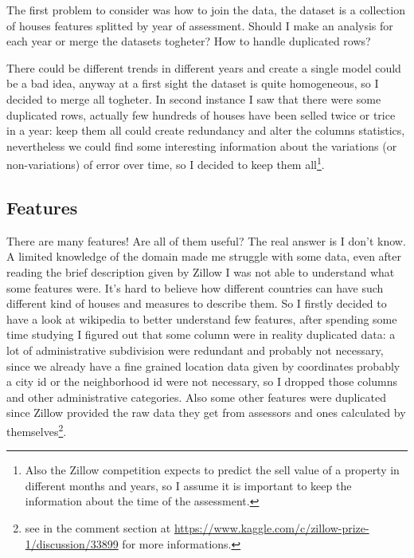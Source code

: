 The first problem to consider was how to join the data, the dataset is a collection of houses features splitted by year of assessment. Should I make an analysis for each year or merge the datasets togheter? How to handle duplicated rows?
    
There could be different trends in different years and create a single model could be a bad idea, anyway at a first sight the dataset is quite homogeneous, so I decided to merge all togheter. In second instance I saw that there were some duplicated rows, actually few hundreds of houses have been selled twice or trice in a year: keep them all could create redundancy and alter the columns statistics, nevertheless we could find some interesting information about the variations (or non-variations) of error over time, so I decided to keep them all\footnote{
    Also the Zillow competition expects to predict the sell value of a property in different months and years, so I assume it is important to keep the information about the time of the assessment.
    }.

\subsection{Features}

There are many features! Are all of them useful? The real answer is I don't know. A limited knowledge of the domain made me struggle with some data, even after reading the brief description given by Zillow I was not able to understand what some features were. It's hard to believe how different countries can have such different kind of houses and measures to describe them. So I firstly decided to have a look at wikipedia to better understand few features, after spending some time studying I figured out that some column were in reality duplicated data: a lot of administrative subdivision were redundant and probably not necessary, since we already have a fine grained location data given by coordinates probably a city id or the neighborhood id were not necessary, so I dropped those columns and other administrative categories. Also some other features were duplicated since Zillow provided the raw data they get from assessors and ones calculated by themselves\footnote{see in the comment section at \url{https://www.kaggle.com/c/zillow-prize-1/discussion/33899} for more informations.}.

